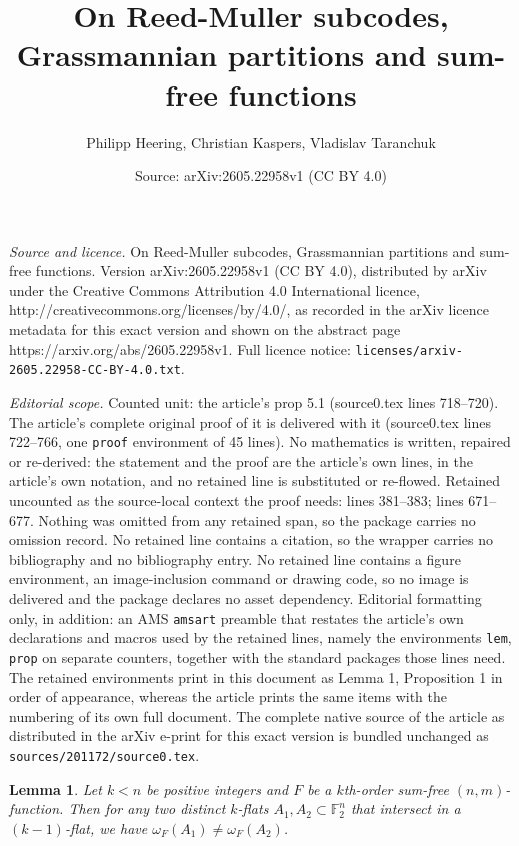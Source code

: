 \documentclass[10pt,a4paper]{amsart}
\title{On Reed-Muller subcodes, Grassmannian partitions and sum-free functions}
\author{Philipp Heering, Christian Kaspers, Vladislav Taranchuk}
\date{Source: arXiv:2605.22958v1 (CC BY 4.0)}
\newtheorem{lem}{Lemma}
\newcommand{\F}{\mathbb F}
\begin{document}
\maketitle

\noindent\emph{Source and licence.} On Reed-Muller subcodes, Grassmannian partitions and sum-free functions. Version arXiv:2605.22958v1 (CC BY 4.0), distributed by arXiv under the Creative Commons Attribution 4.0 International licence, http://creativecommons.org/licenses/by/4.0/, as recorded in the arXiv licence metadata for this exact version and shown on the abstract page https://arxiv.org/abs/2605.22958v1. Full licence notice: \texttt{licenses/arxiv-2605.22958-CC-BY-4.0.txt}.\par\smallskip

\noindent\textit{Editorial scope.} Counted unit: the article's prop 5.1 (source0.tex lines 718--720). The article's complete original proof of it is delivered with it (source0.tex lines 722--766, one \texttt{proof} environment of 45 lines). No mathematics is written, repaired or re-derived: the statement and the proof are the article's own lines, in the article's own notation, and no retained line is substituted or re-flowed.  Retained uncounted as the source-local context the proof needs: lines 381--383; lines 671--677.  Nothing was omitted from any retained span, so the package carries no omission record.  No retained line contains a citation, so the wrapper carries no bibliography and no bibliography entry.  No retained line contains a figure environment, an image-inclusion command or drawing code, so no image is delivered and the package declares no asset dependency.  Editorial formatting only, in addition: an AMS \texttt{amsart} preamble that restates the article's own declarations and macros used by the retained lines, namely the environments \texttt{lem}, \texttt{prop} on separate counters, together with the standard packages those lines need.  The retained environments print in this document as Lemma 1, Proposition 1 in order of appearance, whereas the article prints the same items with the numbering of its own full document.  The complete native source of the article as distributed in the arXiv e-print for this exact version is bundled unchanged as \texttt{sources/201172/source0.tex}.
\begin{lem}\label{L: kth-order coloring}
    Let $k < n$ be positive integers and $F$ be a $k$th-order sum-free $(n, m)$-function. Then for any two distinct $k$-flats $A_1, A_2 \subset \F_2^n$ that intersect in a $(k-1)$-flat, we have $\omega_F(A_1)\neq \omega_F(A_2)$. 
\end{lem}
\end{document}
